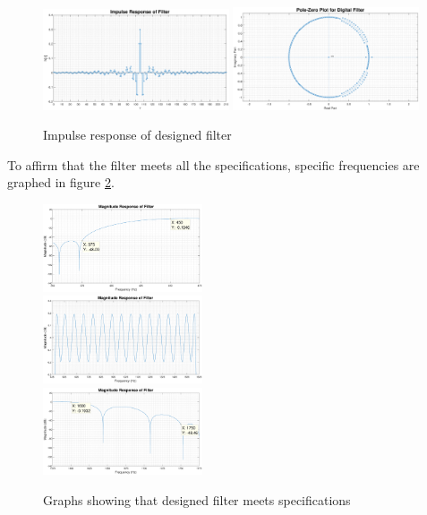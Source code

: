 \documentclass{article}
\begin{document}
\begin{figure}[H]
    \centering
    \includegraphics[width=0.49\textwidth]{impulse_response_filter_1}
    \includegraphics[width=0.49\textwidth]{pole_zero}
    \caption{Impulse response of designed filter}
    \label{fig:filter_coefs}
\end{figure}

To affirm that the filter meets all the specifications, specific frequencies are graphed in figure \ref{fig:filter_1_zooms}.

\begin{figure}[H]
    \centering
    \includegraphics[width=0.42\textwidth]{filter_1_transition_1}\\
    \includegraphics[width=0.42\textwidth]{filter_1_passband}\\
    \includegraphics[width=0.42\textwidth]{filter_1_transition_2}
    \caption{Graphs showing that designed filter meets specifications}
    \label{fig:filter_1_zooms}
\end{figure}
\end{document}
